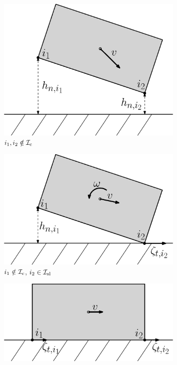 \documentclass[../DC2017114Bouma.tex]{subfiles}
\begin{document}
\begin{figure}[h]
\centering
\begin{subfigure}[b]{0.3\textwidth}
\centering
\includegraphics[width=\textwidth]{example1.eps}
\caption{$i_1,i_2\notin\mathcal{I}_{\text{c}}$}
\label{fig:2example1}
\end{subfigure}
\quad
\begin{subfigure}[b]{0.3\textwidth}  
\centering 
\includegraphics[width=\textwidth]{example2.eps}
\caption{$i_1\notin\mathcal{I}_{\text{c}}$, $i_2\in\mathcal{I}_{\text{sl}}$}
\label{fig:2example2}
\end{subfigure}
\quad
\begin{subfigure}[b]{0.3\textwidth}   
\centering 
\includegraphics[width=\textwidth]{example3.eps}

\end{subfigure}
\end{figure}
\end{document}
